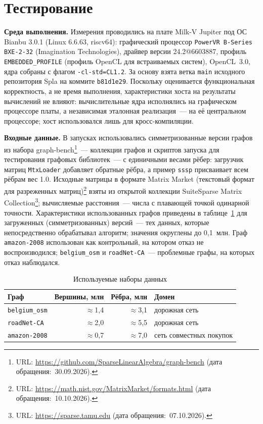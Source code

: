 \documentclass[a4paper]{article}
\begin{document}
\section{Тестирование}

\textbf{Среда выполнения.} Измерения проводились на плате Milk-V Jupiter под ОС Bianbu 3.0.1 (Linux 6.6.63, riscv64): графический процессор \texttt{PowerVR B-Series BXE-2-32} (Imagination Technologies), драйвер версии 24.2@6603887, профиль \texttt{EMBEDDED\_PROFILE} (профиль OpenCL для встраиваемых систем), OpenCL~3.0, ядра собраны с флагом \texttt{-cl-std=CL1.2}. За основу взята ветка \texttt{main} исходного репозитория Spla на коммите \texttt{b81d1e29}. Поскольку оценивается функциональная корректность, а не время выполнения, характеристики хоста на результаты вычислений не влияют: вычислительные ядра исполнялись на графическом процессоре платы, а независимая эталонная реализация~--- на её центральном процессоре; хост использовался лишь для кросс-компиляции.

\textbf{Входные данные.} В запусках использовались симметризованные версии графов из набора graph-bench\footnote{URL: \url{https://github.com/SparseLinearAlgebra/graph-bench} (дата обращения:~30.09.2026).}~--- коллекции графов и скриптов запуска для тестирования графовых библиотек~--- с единичными весами рёбер: загрузчик матриц \texttt{MtxLoader} добавляет обратные рёбра, а пример \texttt{sssp} присваивает всем рёбрам вес 1.0. Исходные матрицы в формате Matrix Market (текстовый формат для разреженных матриц)\footnote{URL: \url{https://math.nist.gov/MatrixMarket/formats.html} (дата обращения:~10.10.2026).} взяты из открытой коллекции SuiteSparse Matrix Collection\footnote{URL: \url{https://sparse.tamu.edu} (дата обращения:~07.10.2026).}; вычисляемые расстояния~--- числа с плавающей точкой одинарной точности. Характеристики использованных графов приведены в таблице~\ref{tab:graphs} для загруженных (симметризованных) версий~--- тех данных, которые непосредственно обрабатывал алгоритм; значения округлены до 0,1~млн. Граф \texttt{amazon-2008} использован как контрольный, на котором отказ не воспроизводился; \texttt{belgium\_osm} и \texttt{roadNet-CA}~--- проблемные графы, на которых отказ наблюдался.

\begin{table}[htbp]
    \centering
    \caption{Используемые наборы данных}
    \label{tab:graphs}
    \begin{tabular}{lrrl}
        \toprule
        \textbf{Граф} & \textbf{Вершины, млн} & \textbf{Рёбра, млн} & \textbf{Домен} \\
        \midrule
        \texttt{belgium\_osm} & $\approx$1,4 & $\approx$3,1 & дорожная сеть \\
        \texttt{roadNet-CA} & $\approx$2,0 & $\approx$5,5 & дорожная сеть \\
        \texttt{amazon-2008} & $\approx$0,7 & $\approx$7,0 & сеть совместных покупок \\
        \bottomrule
    \end{tabular}
\end{table}
\end{document}
